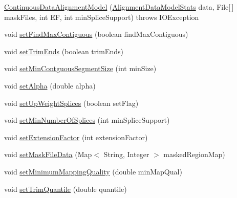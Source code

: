 \begin{DoxyCompactItemize}
\item 
\hyperlink{classbroad_1_1pda_1_1seq_1_1segmentation_1_1_continuous_data_alignment_model_ab3be2b171b13a6d8844ca6cc4415533d}{Continuous\+Data\+Alignment\+Model} (\hyperlink{classbroad_1_1pda_1_1seq_1_1segmentation_1_1_alignment_data_model_stats}{Alignment\+Data\+Model\+Stats} data, File\mbox{[}$\,$\mbox{]} mask\+Files, int E\+F, int min\+Splice\+Support)  throws I\+O\+Exception
\item 
void \hyperlink{classbroad_1_1pda_1_1seq_1_1segmentation_1_1_continuous_data_alignment_model_ae9180b76d6c1bc1ea8d6024a2b08c5db}{set\+Find\+Max\+Contiguous} (boolean find\+Max\+Contiguous)
\item 
void \hyperlink{classbroad_1_1pda_1_1seq_1_1segmentation_1_1_continuous_data_alignment_model_aa17cb50bb398dc7770859377e8d9771e}{set\+Trim\+Ends} (boolean trim\+Ends)
\item 
void \hyperlink{classbroad_1_1pda_1_1seq_1_1segmentation_1_1_continuous_data_alignment_model_ab7ab620d4f4c1b25acc716d83a8d72b6}{set\+Min\+Contguous\+Segment\+Size} (int min\+Size)
\item 
void \hyperlink{classbroad_1_1pda_1_1seq_1_1segmentation_1_1_continuous_data_alignment_model_a8c1d4aef55169c5f5cc897edec41c1ff}{set\+Alpha} (double alpha)
\item 
void \hyperlink{classbroad_1_1pda_1_1seq_1_1segmentation_1_1_continuous_data_alignment_model_af559e50d0cbcc7525afd106c4bb93418}{set\+Up\+Weight\+Splices} (boolean set\+Flag)
\item 
void \hyperlink{classbroad_1_1pda_1_1seq_1_1segmentation_1_1_continuous_data_alignment_model_a61ed951795b265ba619f938e715ca1ab}{set\+Min\+Number\+Of\+Splices} (int min\+Splice\+Support)
\item 
void \hyperlink{classbroad_1_1pda_1_1seq_1_1segmentation_1_1_continuous_data_alignment_model_a1e3aa5641fa5aa9963d9a3b05870012a}{set\+Extension\+Factor} (int extension\+Factor)
\item 
void \hyperlink{classbroad_1_1pda_1_1seq_1_1segmentation_1_1_continuous_data_alignment_model_ac019bf49be802c3b62d3a3055104c365}{set\+Mask\+File\+Data} (Map$<$ String, Integer $>$ masked\+Region\+Map)
\item 
void \hyperlink{classbroad_1_1pda_1_1seq_1_1segmentation_1_1_continuous_data_alignment_model_a13f7d8efa23552e98f798e9deec570de}{set\+Minimum\+Mapping\+Quality} (double min\+Map\+Qual)
\item 
void \hyperlink{classbroad_1_1pda_1_1seq_1_1segmentation_1_1_continuous_data_alignment_model_a05c9b50b32fd0cdfee049966ae7b9c1e}{set\+Trim\+Quantile} (double quantile)

\end{DoxyCompactItemize}
